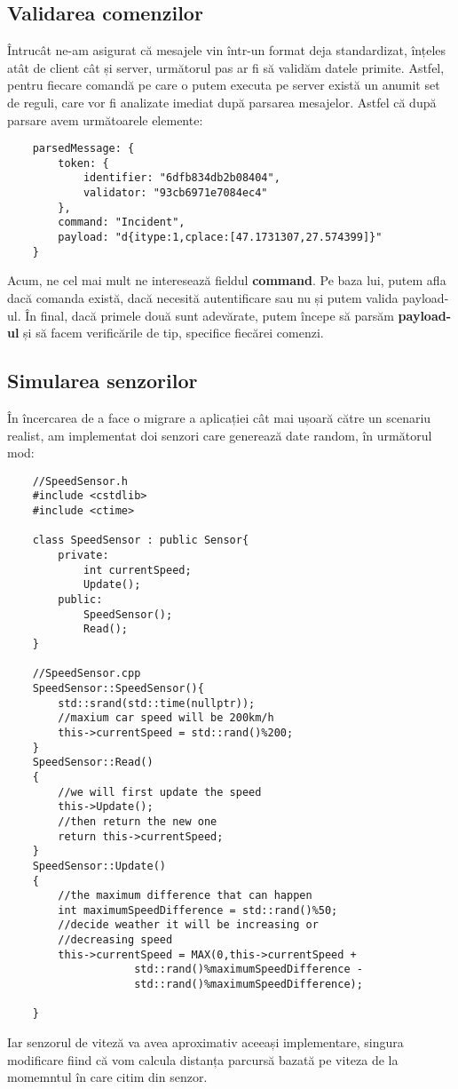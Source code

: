 \documentclass{article}
\begin{document}
\subsection{Validarea comenzilor}
Întrucât ne-am asigurat că mesajele vin într-un format deja standardizat, înțeles atât de client cât și server, următorul pas ar fi să validăm datele primite. Astfel, pentru fiecare comandă pe care o putem executa pe server există un anumit set de reguli, care vor fi analizate imediat după parsarea mesajelor. Astfel că după parsare avem următoarele elemente:
\begin{lstlisting}
    parsedMessage: {
        token: {
            identifier: "6dfb834db2b08404",
            validator: "93cb6971e7084ec4"
        },
        command: "Incident",
        payload: "d{itype:1,cplace:[47.1731307,27.574399]}"
    }    
\end{lstlisting}
Acum, ne cel mai mult ne interesează fieldul \textbf{command}. Pe baza lui, putem afla dacă comanda există, dacă necesită autentificare sau nu și putem valida payload-ul. În final, dacă primele două sunt adevărate, putem începe să parsăm \textbf{payload-ul} și să facem verificările de tip, specifice fiecărei comenzi. 

\subsection{Simularea senzorilor}
În încercarea de a face o migrare a aplicației cât mai ușoară către un scenariu realist, am implementat doi senzori care generează date random, în următorul mod:
\begin{lstlisting}
    //SpeedSensor.h
    #include <cstdlib>
    #include <ctime>

    class SpeedSensor : public Sensor{
        private:
            int currentSpeed;
            Update();
        public:
            SpeedSensor();
            Read();
    }

    //SpeedSensor.cpp
    SpeedSensor::SpeedSensor(){
        std::srand(std::time(nullptr));
        //maxium car speed will be 200km/h
        this->currentSpeed = std::rand()%200;
    }
    SpeedSensor::Read()
    {
        //we will first update the speed 
        this->Update();
        //then return the new one
        return this->currentSpeed;
    }
    SpeedSensor::Update()
    {
        //the maximum difference that can happen
        int maximumSpeedDifference = std::rand()%50;
        //decide weather it will be increasing or 
        //decreasing speed
        this->currentSpeed = MAX(0,this->currentSpeed + 
                    std::rand()%maximumSpeedDifference - 
                    std::rand()%maximumSpeedDifference);
    
    }
\end{lstlisting}
Iar senzorul de viteză va avea aproximativ aceeași implementare, singura modificare fiind că vom calcula distanța parcursă bazată pe viteza de la momemntul în care citim din senzor. 
\end{document}
